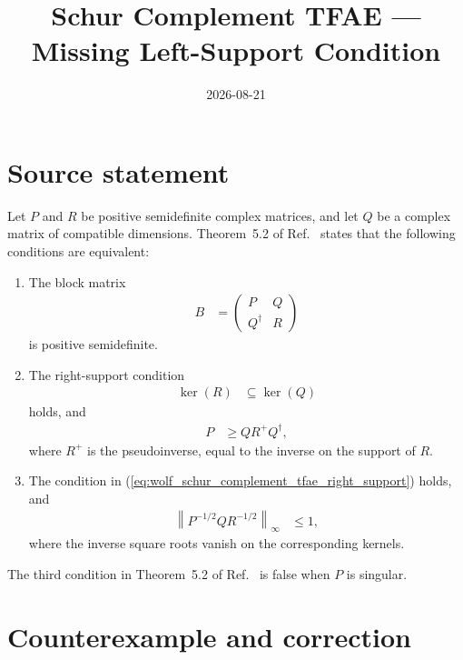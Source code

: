 \documentclass{article}
\title{Schur Complement TFAE --- Missing Left-Support Condition}
\author{}
\date{2026-08-21}
\begin{document}
\maketitle
{}

\section{Source statement}

Let $P$ and $R$ be positive semidefinite complex matrices, and let $Q$ be a
complex matrix of compatible dimensions. Theorem~5.2 of
Ref.~\cite{Wolf2012Quantum} states that the following conditions are
equivalent:
\begin{enumerate}
    \item The block matrix
    \begin{align}
        B&=
        \begin{pmatrix}
            P & Q\\
            Q^\dagger & R
        \end{pmatrix}
    \label{eq:wolf_schur_complement_tfae_block_matrix}
    \end{align}
    is positive semidefinite.

    \item The right-support condition
    \begin{align}
        \ker(R)&\subseteq\ker(Q)
    \label{eq:wolf_schur_complement_tfae_right_support}
    \end{align}
    holds, and
    \begin{align}
        P&\geq QR^+Q^\dagger,
    \label{eq:wolf_schur_complement_tfae_schur_inequality}
    \end{align}
    where $R^+$ is the pseudoinverse, equal to the inverse on the support of
    $R$.

    \item The condition in
    (\ref{eq:wolf_schur_complement_tfae_right_support}) holds, and
    \begin{align}
        \left\lVert P^{-1/2}QR^{-1/2}\right\rVert_\infty
            &\leq1,
    \label{eq:wolf_schur_complement_tfae_printed_contraction}
    \end{align}
    where the inverse square roots vanish on the corresponding kernels.
\end{enumerate}

The third condition in Theorem~5.2 of Ref.~\cite{Wolf2012Quantum} is false
when $P$ is singular.

\section{Counterexample and correction}
\end{document}
